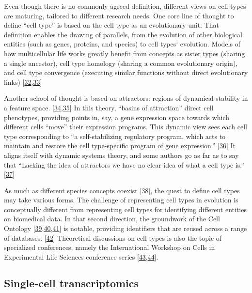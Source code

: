 Even though there is no commonly agreed definition, different views on cell types are maturing, tailored to different research needs.
One core line of thought to define ``cell type'' is based on the cell type as an evolutionary unit.
That definition enables the drawing of parallels, from the evolution of other biological entities (such as genes, proteins, and species) to cell types' evolution.
Models of how multicellular life works greatly benefit from concepts as sister types (sharing a single ancestor), cell type homology (sharing a common evolutionary origin), and cell type convergence (executing similar functions without direct evolutionary links) {[}\protect\hyperlink{ref-O95WN4x0}{32},\protect\hyperlink{ref-ogAGO9KH}{33}{]}

Another school of thought is based on attractors: regions of dynamical stability in a feature space. {[}\protect\hyperlink{ref-14J9lsoMd}{34},\protect\hyperlink{ref-OjxQDZpx}{35}{]}
In this theory, ``basins of attraction'' direct cell phenotypes, providing points in, say, a gene expression space towards which different cells ``move'' their expression programs.
This dynamic view sees each cell type corresponding to ``a self-stabilizing regulatory program, which acts to maintain and restore the cell type-specific program of gene expression.'' {[}\protect\hyperlink{ref-19g5Iusf9}{36}{]}
It aligns itself with dynamic systems theory, and some authors go as far as to say that ``Lacking the idea of attractors we have no clear idea of what a cell type is.'' {[}\protect\hyperlink{ref-4TJnL1xT}{37}{]}

As much as different species concepts coexist {[}\protect\hyperlink{ref-g74dZjOM}{38}{]}, the quest to define cell types may take various forms.
The challenge of representing cell types in evolution is conceptually different from representing cell types for identifying different entities on biomedical data.
In that second direction, the groundwork of the Cell Ontology {[}\protect\hyperlink{ref-1CI8uS6ka}{39},\protect\hyperlink{ref-gAysgnsS}{40},\protect\hyperlink{ref-17U3pGEjv}{41}{]} is notable, providing identifiers that are reused across a range of databases. {[}\protect\hyperlink{ref-qT8WxqjA}{42}{]}
Theoretical discussions on cell types is also the topic of specialized conferences, namely the International Workshop on Cells in Experimental Life Sciences conference series {[}\protect\hyperlink{ref-jX2ZmXcc}{43},\protect\hyperlink{ref-rK8KD0us}{44}{]}.

\hypertarget{single-cell-transcriptomics}{%
\subsection{Single-cell transcriptomics}\label{single-cell-transcriptomics}}

